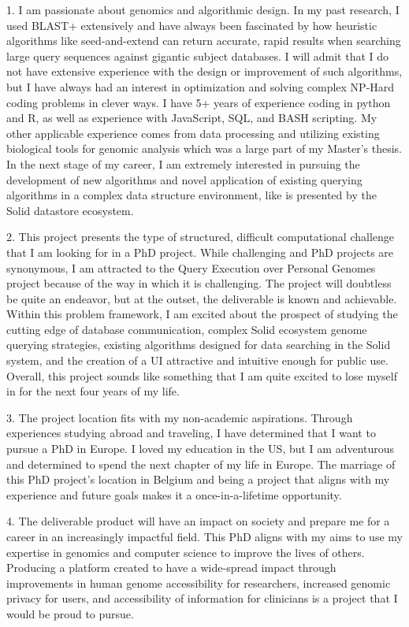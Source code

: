 {1. I am passionate about genomics and algorithmic design. 
In my past research, I used BLAST+ extensively and have always been fascinated by how heuristic algorithms like seed-and-extend can return accurate, rapid results when searching large query sequences against gigantic subject databases. 
I will admit that I do not have extensive experience with the design or improvement of such algorithms, but I have always had an interest in optimization and solving complex NP-Hard coding problems in clever ways. 
I have 5+ years of experience coding in python and R, as well as experience with JavaScript, SQL, and BASH scripting. 
My other applicable experience comes from data processing and utilizing existing biological tools for genomic analysis which was a large part of my Master’s thesis. 
In the next stage of my career, I am extremely interested in pursuing the development of new algorithms and novel application of existing querying algorithms in a complex data structure environment, like is presented by the Solid datastore ecosystem.

2. This project presents the type of structured, difficult computational challenge that I am looking for in a PhD project. 
While challenging and PhD projects are synonymous, I am attracted to the Query Execution over Personal Genomes project because of the way in which it is challenging. 
The project will doubtless be quite an endeavor, but at the outset, the deliverable is known and achievable. 
Within this problem framework, I am excited about the prospect of studying the cutting edge of database communication, complex Solid ecosystem genome querying strategies, existing algorithms designed for data searching in the Solid system, and the creation of a UI attractive and intuitive enough for public use. 
Overall, this project sounds like something that I am quite excited to lose myself in for the next four years of my life. 

3. The project location fits with my non-academic aspirations. 
Through experiences studying abroad and traveling, I have determined that I want to pursue a PhD in Europe. 
I loved my education in the US, but I am adventurous and determined to spend the next chapter of my life in Europe. 
The marriage of this PhD project’s location in Belgium and being a project that aligns with my experience and future goals makes it a once-in-a-lifetime opportunity.

4. The deliverable product will have an impact on society and prepare me for a career in an increasingly impactful field. 
This PhD aligns with my aims to use my expertise in genomics and computer science to improve the lives of others. 
Producing a platform created to have a wide-spread impact through improvements in human genome accessibility for researchers, increased genomic privacy for users, and accessibility of information for clinicians is a project that I would be proud to pursue.

}

